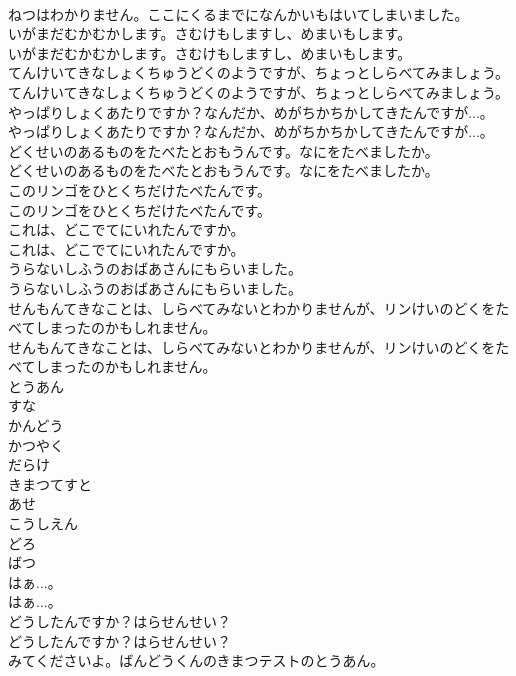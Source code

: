 \documentclass[8pt]{extreport}
\begin{document}
\begin{CJK}{UTF8}{min}
\\	ねつはわかりません。ここにくるまでになんかいもはいてしまいました。
\\	いがまだむかむかします。さむけもしますし、めまいもします。
\\	いがまだむかむかします。さむけもしますし、めまいもします。
\\	てんけいてきなしょくちゅうどくのようですが、ちょっとしらべてみましょう。
\\	てんけいてきなしょくちゅうどくのようですが、ちょっとしらべてみましょう。
\\	やっぱりしょくあたりですか？なんだか、めがちかちかしてきたんですが...。
\\	やっぱりしょくあたりですか？なんだか、めがちかちかしてきたんですが...。
\\	どくせいのあるものをたべたとおもうんです。なにをたべましたか。
\\	どくせいのあるものをたべたとおもうんです。なにをたべましたか。
\\	このリンゴをひとくちだけたべたんです。
\\	このリンゴをひとくちだけたべたんです。
\\	これは、どこでてにいれたんですか。
\\	これは、どこでてにいれたんですか。
\\	うらないしふうのおばあさんにもらいました。
\\	うらないしふうのおばあさんにもらいました。
\\	せんもんてきなことは、しらべてみないとわかりませんが、リンけいのどくをたべてしまったのかもしれません。
\\	せんもんてきなことは、しらべてみないとわかりませんが、リンけいのどくをたべてしまったのかもしれません。
\\	とうあん
\\	すな
\\	かんどう
\\	かつやく
\\	だらけ
\\	きまつてすと
\\	あせ
\\	こうしえん
\\	どろ
\\	ばつ
\\	はぁ...。
\\	はぁ...。
\\	どうしたんですか？はらせんせい？
\\	どうしたんですか？はらせんせい？
\\	みてくださいよ。ばんどうくんのきまつテストのとうあん。

\end{CJK}
\end{document}
